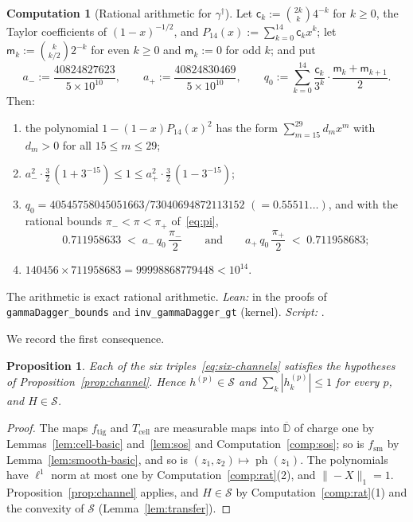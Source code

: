 \documentclass[11pt,reqno]{amsart}
\newtheorem{proposition}[theorem]{Proposition}
\theoremstyle{definition}
\newtheorem{computation}{Computation}
\numberwithin{equation}{section}
\newcommand{\D}{\mathbb{D}}
\newcommand{\gd}{\gamma^\dagger}
\newcommand{\ph}{\operatorname{ph}}
\newcommand{\lone}[1]{\|#1\|_1}
\newcommand{\Scl}{\mathcal{S}}
\newcommand{\Tcell}{T_{\mathrm{cell}}}
\newcommand{\ftig}{f_{\mathrm{tig}}}
\newcommand{\fsm}{f_{\mathrm{sm}}}
\begin{document}
\begin{computation}[Rational arithmetic for $\gd$]\label{comp:gd}
Let $\mathsf{c}_k:=\binom{2k}{k}4^{-k}$ for $k\ge0$, the Taylor coefficients of $(1-x)^{-1/2}$, and $P_{14}(x) := \sum_{k=0}^{14} \mathsf{c}_k x^k$; let $\mathsf{m}_k:=\binom{k}{k/2}2^{-k}$ for even $k\ge0$ and $\mathsf{m}_k:=0$ for odd $k$; and put
\[
  a_-:=\frac{40824827623}{5\times10^{10}},\qquad a_+:=\frac{40824830469}{5\times10^{10}},\qquad
  q_0:=\sum_{k=0}^{14}\frac{\mathsf{c}_k}{3^k}\cdot\frac{\mathsf{m}_k+\mathsf{m}_{k+1}}{2} .
\]
Then:
\begin{enumerate}
  \item the polynomial $1-(1-x)P_{14}(x)^2$ has the form $\sum_{m=15}^{29}d_mx^m$ with $d_m>0$ for all $15\le m\le29$;
  \item $a_-^2\cdot\frac32\,(1+3^{-15})\le1\le a_+^2\cdot\frac32\,(1-3^{-15})$;
  \item $q_0=40545758045051663/73040694872113152$ $(=0.55511\ldots)$, and with the rational bounds $\pi_-<\pi<\pi_+$ of~\eqref{eq:pi},
  \[
    0.711958633\;<\;a_-\,q_0\,\frac{\pi_-}2\qquad\text{and}\qquad a_+\,q_0\,\frac{\pi_+}2\;<\;0.711958683 ;
  \]
  \item $140456 \times 711958683 = 99998868779448 < 10^{14}$.
\end{enumerate}
The arithmetic is exact rational arithmetic. \emph{Lean:} in the proofs of \texttt{gammaDagger\_bounds} and \texttt{inv\_gammaDagger\_gt} (kernel). \emph{Script:} .
\end{computation}

We record the first consequence.

\begin{proposition}\label{prop:channels-dominated}
Each of the six triples~\eqref{eq:six-channels} satisfies the hypotheses of Proposition~\ref{prop:channel}. Hence $h^{(p)}\in\Scl$ and $\sum_k|h^{(p)}_k|\le1$ for every $p$, and $H\in\Scl$.
\end{proposition}

\begin{proof}
The maps $\ftig$ and $\Tcell$ are measurable maps into $\overline{\D}$ of charge one by Lemmas~\ref{lem:cell-basic} and~\ref{lem:sos} and Computation~\ref{comp:sos}; so is $\fsm$ by Lemma~\ref{lem:smooth-basic}, and so is $(z_1,z_2)\mapsto\ph(z_1)$. The polynomials have $\ell^1$ norm at most one by Computation~\ref{comp:rat}(2), and $\lone{-X}=1$. Proposition~\ref{prop:channel} applies, and $H\in\Scl$ by Computation~\ref{comp:rat}(1) and the convexity of $\Scl$ (Lemma~\ref{lem:transfer}).
\end{proof}
\end{document}
